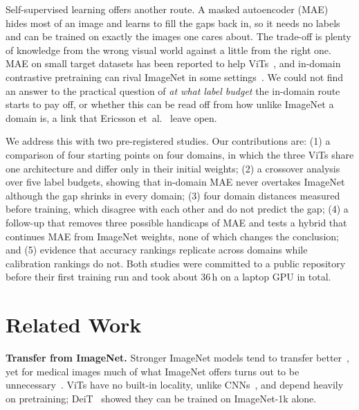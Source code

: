 \documentclass[conference]{IEEEtran}
\begin{document}
Self-supervised learning offers another route. A masked autoencoder (MAE)~\cite{he2022mae} hides most of an image
and learns to fill the gaps back in, so it needs no labels and can be trained on exactly the images one cares about.
The trade-off is plenty of knowledge from the wrong visual world against a little from the right one. MAE on small
target datasets has been reported to help
ViTs~\cite{elnouby2021largescale,zhou2022selfpretrain,mao2022maedatahungry,das2024limited}, and in-domain
contrastive pretraining can rival ImageNet in some settings~\cite{cole2022contrastive}. We could not find an answer
to the practical question of \emph{at what label budget} the in-domain route starts to pay off, or whether this can
be read off from how unlike ImageNet a domain is, a link that Ericsson et~al.~\cite{ericsson2021transfer} leave open.

We address this with two pre-registered studies. Our contributions are: (1) a comparison of four starting points on
four domains, in which the three ViTs share one architecture and differ only in their initial weights; (2) a
crossover analysis over five label budgets, showing that in-domain MAE never overtakes ImageNet although the gap
shrinks in every domain; (3) four domain distances measured before training, which disagree with each other and
do not predict the gap; (4) a follow-up that removes three possible handicaps of MAE and tests a hybrid that
continues MAE from ImageNet weights, none of which changes the conclusion; and (5) evidence that accuracy rankings
replicate across domains while calibration rankings do not. Both studies were committed to a public repository
before their first training run and took about 36\,h on a laptop GPU in total.

\section{Related Work}
\textbf{Transfer from ImageNet.} Stronger ImageNet models tend to transfer better~\cite{kornblith2019transfer},
yet for medical images much of what ImageNet offers turns out to be unnecessary~\cite{raghu2019transfusion}. ViTs
\cite{dosovitskiy2021vit} have no built-in locality, unlike CNNs~\cite{he2016resnet}, and depend heavily on
pretraining; DeiT~\cite{touvron2021deit} showed they can be trained on ImageNet-1k alone.
\end{document}
